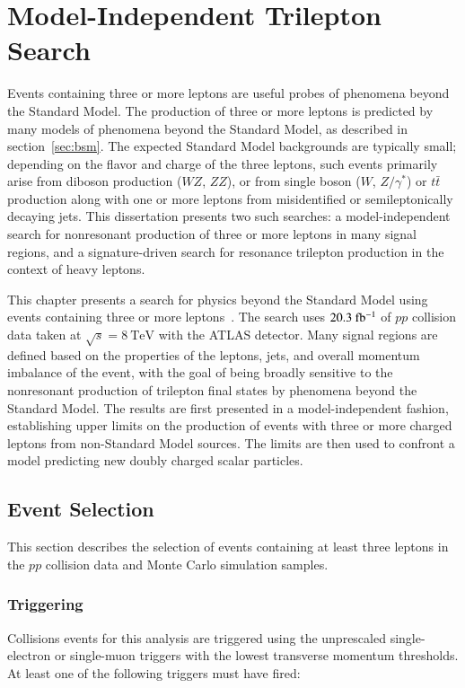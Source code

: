 \chapter{Model-Independent Trilepton Search}\label{ch:model-independent-trilepton-search}

Events containing three or more leptons are useful probes of phenomena beyond the Standard Model. The production of three or more leptons is predicted by many models of phenomena beyond the Standard Model, as described in section~\ref{sec:bsm}. The expected Standard Model backgrounds are typically small; depending on the flavor and charge of the three leptons, such events primarily arise from diboson production ($WZ$, $ZZ$), or from single boson ($W$, $Z/\gamma^{*}$) or $t\bar{t}$ production along with one or more leptons from misidentified or semileptonically decaying jets.  This dissertation presents two such searches: a model-independent search for nonresonant production of three or more leptons in many signal regions, and a signature-driven search for resonance trilepton production in the context of heavy leptons. 

This chapter presents a search for physics beyond the Standard Model using events containing three or more leptons~\cite{Aad:2014hja}. The search uses $20.3~\mbox{fb$^{-1}$}$ of $pp$ collision data taken at $\sqrt{s}=8~\mbox{TeV}$ with the ATLAS detector. Many signal regions are defined based on the properties of the leptons, jets, and overall momentum imbalance of the event, with the goal of being broadly sensitive to the nonresonant production of trilepton final states by phenomena beyond the Standard Model. The results are first presented in a model-independent fashion, establishing upper limits on the production of events with three or more charged leptons from non-Standard Model sources. The limits are then used to confront a model predicting new doubly charged scalar particles. 

\section{Event Selection}\label{sec:model-independent-event-selection}

This section describes the selection of events containing at least three leptons in the $pp$ collision data and Monte Carlo simulation samples. 

\subsection{Triggering}\label{sec:model-independent-event-selection-triggering}
Collisions events for this analysis are triggered using the unprescaled single-electron or single-muon triggers with the lowest transverse momentum thresholds. At least one of the following triggers must have fired:

